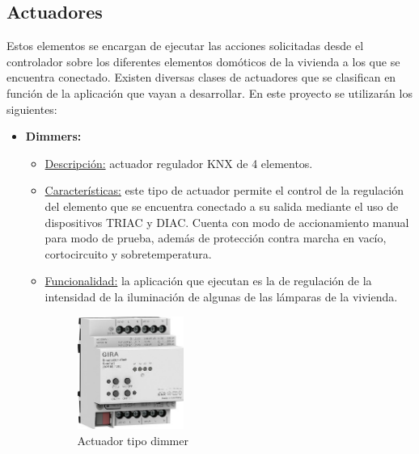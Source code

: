 \subsection{Actuadores} Estos elementos se encargan de ejecutar las acciones solicitadas desde el controlador sobre los diferentes elementos domóticos de la vivienda a los que se encuentra conectado. Existen diversas clases de actuadores que se clasifican en función de la aplicación que vayan a desarrollar. En este proyecto se utilizarán los siguientes:

\begin{itemize}
\item \textbf{Dimmers:} 
	\begin{itemize}
	\item\underline{Descripción:} actuador regulador KNX de 4 elementos.
	\item \underline{Características:} este tipo de actuador permite el control de la regulación del elemento que se encuentra conectado a su salida mediante el uso de dispositivos TRIAC y DIAC. Cuenta con modo de accionamiento manual para modo de prueba, además de protección contra marcha en vacío, cortocircuito y sobretemperatura. 
	\item \underline{Funcionalidad:} la aplicación que ejecutan es la de regulación de la intensidad de la iluminación de algunas de las lámparas de la vivienda.\\ [0,15 cm]
		\begin{figure}[H]
		\centering
		\includegraphics[width=0.35\textwidth]{figures/actuador_dimmer.jpg}   
		\caption{Actuador tipo dimmer}
		\label{fig:actuador_dimmer}
		\end{figure}
	\end{itemize} 



\end{itemize}

